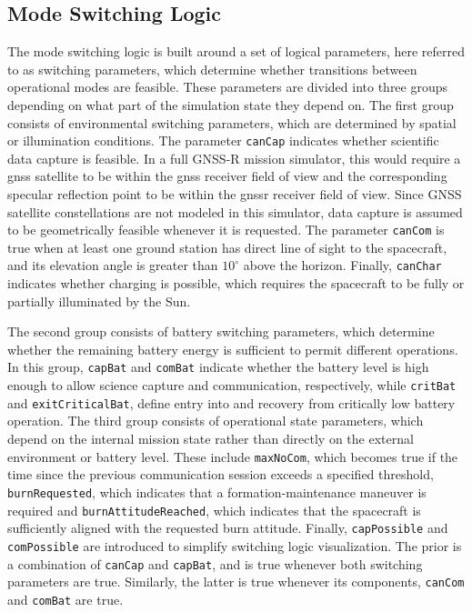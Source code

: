 \subsection{Mode Switching Logic}
\label{sec:mode_switching_logic}
The mode switching logic is built around a set of logical parameters, here referred to as switching parameters, which determine whether transitions between operational modes are feasible. These parameters are divided into three groups depending on what part of the simulation state they depend on. The first group consists of environmental switching parameters, which are determined by spatial or illumination conditions. The parameter \texttt{canCap} indicates whether scientific data capture is feasible. In a full GNSS-R mission simulator, this would require a \gls{gnss} satellite to be within the \gls{gnss} receiver field of view and the corresponding specular reflection point to be within the \gls{gnssr} receiver field of view. Since GNSS satellite constellations are not modeled in this simulator, data capture is assumed to be geometrically feasible whenever it is requested. The parameter \texttt{canCom} is true when at least one ground station has direct line of sight to the spacecraft, and its elevation angle is greater than $10^\circ$ above the horizon. Finally, \texttt{canChar} indicates whether charging is possible, which requires the spacecraft to be fully or partially illuminated by the Sun. 

The second group consists of battery switching parameters, which determine whether the remaining battery energy is sufficient to permit different operations. In this group, \texttt{capBat} and \texttt{comBat} indicate whether the battery level is high enough to allow science capture and communication, respectively, while \texttt{critBat} and \texttt{exitCriticalBat}, define entry into and recovery from critically low battery operation. The third group consists of operational state parameters, which depend on the internal mission state rather than directly on the external environment or battery level. These include \texttt{maxNoCom}, which becomes true if the time since the previous communication session exceeds a specified threshold, \texttt{burnRequested}, which indicates that a formation-maintenance maneuver is required and \texttt{burnAttitudeReached}, which indicates that the spacecraft is sufficiently aligned with the requested burn attitude. Finally, \texttt{capPossible} and \texttt{comPossible} are introduced to simplify switching logic visualization. The prior is a combination of \texttt{canCap} and \texttt{capBat}, and is true whenever both switching parameters are true. Similarly, the latter is true whenever its components, \texttt{canCom} and \texttt{comBat} are true.

